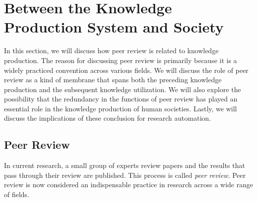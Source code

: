 


\section{Between the Knowledge Production System and Society}
In this section, we will discuss how peer review is related to knowledge production. The reason for discussing peer review is primarily because it is a widely practiced convention across various fields. We will discuss the role of peer review as a kind of membrane that spans both the preceding knowledge production and the subsequent knowledge utilization. We will also explore the possibility that the redundancy in the functions of peer review has played an essential role in the knowledge production of human societies. Lastly, we will discuss the implications of these conclusion for research automation.





\subsection{Peer Review}
In current research, a small group of experts review papers and the results that pass through their review are published. This process is called \textit{peer review}. Peer review is now considered an indispensable practice in research across a wide range of fields.

